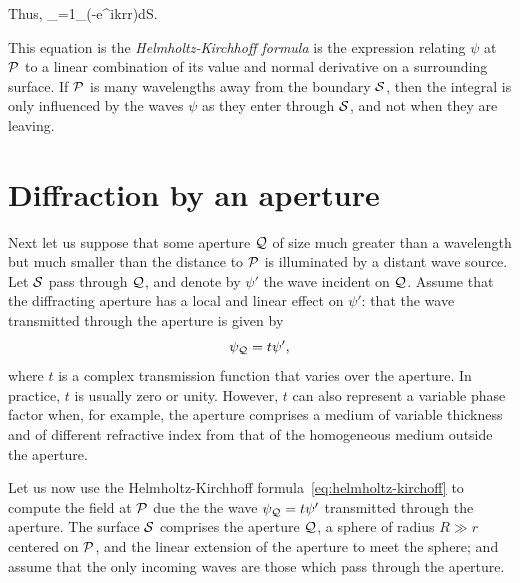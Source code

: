 Thus,
\be
\psi_={1\pi}\int_\left(\psi{}-{e^{ikr}\over r}\nabla\psi\right)\cdot d{\bm S}.
\label{eq:helmholtz-kirchoff}
\ee

This equation is the {\it Helmholtz-Kirchhoff formula} is the expression relating $\psi$ at 
${\cal P}$ to a linear combination of its value and normal derivative on a surrounding surface.
If ${\cal P}$ is many wavelengths away from the boundary ${\cal S}$, then the integral is only 
influenced by the waves $\psi$ as they enter through ${\cal S}$, and not when they are
leaving.

\section{Diffraction by an aperture}

Next let us suppose that some aperture ${\cal Q}$ of size much greater than a wavelength but
much smaller than the distance to ${\cal P}$ is illuminated by a distant wave source. Let 
${\cal S}$ pass through ${\cal Q}$, and denote by $\psi'$ the wave incident on ${\cal Q}$. Assume
that the diffracting aperture has a local and linear effect on $\psi'$: that the wave 
transmitted through the aperture is given by 
\[
\psi_{\cal Q}=t\psi',
\]
where $t$ is a complex transmission function that varies over the aperture. In practice, $t$
is usually zero or unity. However, $t$ can also represent a variable phase factor when, for
example, the aperture comprises a medium of variable thickness and of different refractive
index from that of the homogeneous medium outside the aperture.

Let us now use the Helmholtz-Kirchhoff formula~\ref{eq:helmholtz-kirchoff} to compute the field
at ${\cal P}$ due the the wave $\psi_{\cal Q}=t\psi'$ transmitted through the aperture. The
surface ${\cal S}$ comprises the aperture ${\cal Q}$, a sphere of radius $R\gg r$ centered on 
${\cal P}$, and the linear extension of the aperture to meet the sphere; and assume that the only
incoming waves are those which pass through the aperture. 

